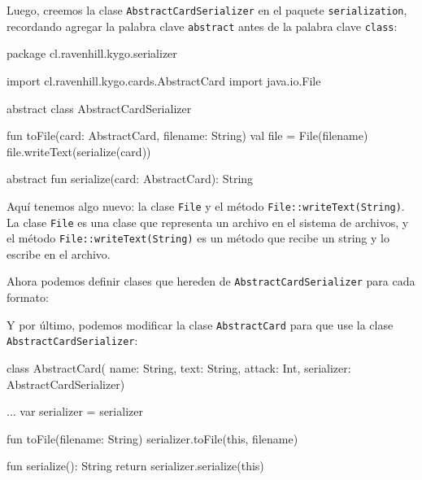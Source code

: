   Luego, creemos la clase \texttt{AbstractCardSerializer} en el paquete \texttt{serialization}, 
  recordando agregar la palabra clave \texttt{abstract} antes de la palabra clave \texttt{class}:

  \begin{kotlin}
    package cl.ravenhill.kygo.serializer

    import cl.ravenhill.kygo.cards.AbstractCard
    import java.io.File


    abstract class AbstractCardSerializer {
      fun toFile(card: AbstractCard, filename: String) {
        val file = File(filename)
        file.writeText(serialize(card))
      }

      abstract fun serialize(card: AbstractCard): String
    }
  \end{kotlin}

  Aquí tenemos algo nuevo: la clase \texttt{File} y el método \texttt{File::writeText(String)}.
  La clase \texttt{File} es una clase que representa un archivo en el sistema de archivos, y el
  método \texttt{File::writeText(String)} es un método que recibe un string y lo escribe en el
  archivo.

  Ahora podemos definir clases que hereden de \texttt{AbstractCardSerializer} para cada formato:




  Y por último, podemos modificar la clase \texttt{AbstractCard} para que use la clase
  \texttt{AbstractCardSerializer}:

  \begin{kotlin}
    class AbstractCard(
      name: String, text: String, attack: Int, 
      serializer: AbstractCardSerializer) {
      ...
      var serializer = serializer

      fun toFile(filename: String) {
        serializer.toFile(this, filename)
      }

      fun serialize(): String {
        return serializer.serialize(this)
      }
    }
  \end{kotlin}

